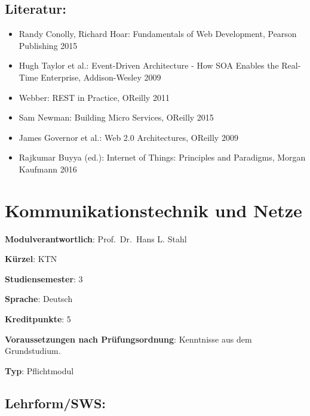 \section*{Literatur:}\label{literatur-8}

\begin{itemize}
\tightlist
\item
  Randy Conolly, Richard Hoar: Fundamentals of Web Development, Pearson
  Publishing 2015
\item
  Hugh Taylor et al.: Event-Driven Architecture - How SOA Enables the
  Real-Time Enterprise, Addison-Wesley 2009
\item
  Webber: REST in Practice, OReilly 2011
\item
  Sam Newman: Building Micro Services, OReilly 2015
\item
  James Governor et al.: Web 2.0 Architectures, OReilly 2009
\item
  Rajkumar Buyya (ed.): Internet of Things: Principles and Paradigms,
  Morgan Kaufmann 2016
\end{itemize}

\chapter{Kommunikationstechnik und
Netze}\label{kommunikationstechnik-und-netze}

\begin{modulHead}
\textbf{Modulverantwortlich}: Prof.~Dr.~Hans L.
Stahl
\end{modulHead}
\begin{modulHead}
\textbf{Kürzel}:
KTN
\end{modulHead}
\begin{modulHead}
\textbf{Studiensemester}:
3
\end{modulHead}
\begin{modulHead}
\textbf{Sprache}:
Deutsch
\end{modulHead}
\begin{modulHead}
\textbf{Kreditpunkte}:
5
\end{modulHead}
\begin{modulHead}
\textbf{Voraussetzungen nach
Prüfungsordnung}: Kenntnisse aus dem
Grundstudium.
\end{modulHead}
\begin{modulHead}
\textbf{Typ}:
Pflichtmodul
\end{modulHead}


\section*{Lehrform/SWS:}\label{lehrformsws-12}

